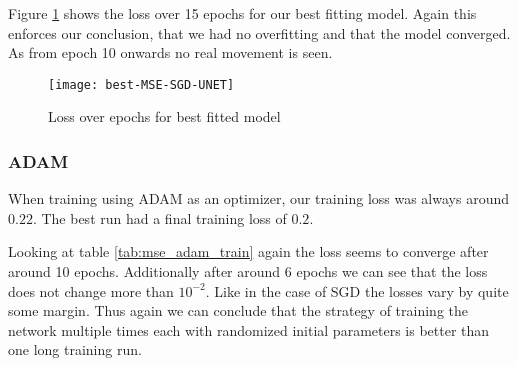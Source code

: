 Figure \ref{im:best-MSE-SGD-UNET} shows the loss over 15 epochs for
our best fitting model. Again this enforces our conclusion, that we had no overfitting and that the model converged.
As from epoch 10 onwards no real movement is seen.


\begin{figure}[h]
\texttt{[image: best-MSE-SGD-UNET]}
\caption{\label{im:best-MSE-SGD-UNET} Loss over epochs for best fitted model}
\end{figure}

\newpage

\subsubsection{ADAM}
When training using ADAM as an optimizer, our training loss was always around $0.22$.
The best run had a final training loss of $0.2$.

Looking at table \ref{tab:mse_adam_train} again the loss seems to converge after around 10 epochs.
Additionally after around 6 epochs we can see that the loss does not change more than $10^{-2}$. Like in the
case of SGD the losses vary by quite some margin. Thus again we can conclude that the
strategy of training the network multiple times each with randomized initial parameters
is better than one long training run.

